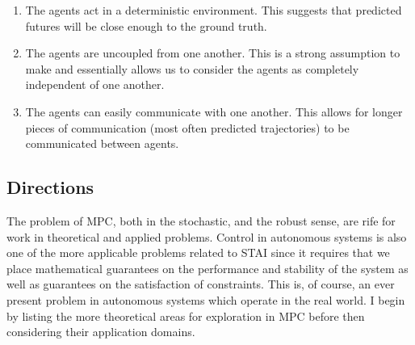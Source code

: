 \documentclass[preprint,11pt]{report}
\begin{document}
\begin{enumerate}
	\item The agents act in a deterministic environment. This suggests that predicted futures will
	be close enough to the ground truth.
	\item The agents are uncoupled from one another. This is a strong assumption to make and
	essentially allows us to consider the agents as completely independent of one another. 
	\item The agents can easily communicate with one another. This allows for longer pieces of
	communication (most often predicted trajectories) to be communicated between agents.
\end{enumerate}


\subsection{Directions}

The problem of MPC, both in the stochastic, and the robust sense, are rife for work in theoretical
and applied problems. Control in autonomous systems is also one of the more applicable problems
related to STAI since it requires that we place mathematical guarantees on the performance and
stability of the system as well as guarantees on the satisfaction of constraints. This is, of
course, an ever present problem in autonomous systems which operate in the real world. I begin by
listing the more theoretical areas for exploration in MPC before then considering their application
domains.
\end{document}
